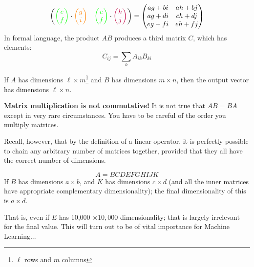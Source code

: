 \documentclass[a4paper,openany,11pt]{book}
\begin{document}
\begin{equation}
\begin{pmatrix}
							{\color{green} \begin{pmatrix} e \\ f \end{pmatrix}} \cdot {\color{orange}\begin{pmatrix} g \\ i \end{pmatrix}} & {\color{green} \begin{pmatrix} e \\ f \end{pmatrix}}  \cdot {\color{purple}\begin{pmatrix} h \\ j \end{pmatrix}} 
						\end{pmatrix}= \begin{pmatrix} ag + bi & ah + bj \\ ag + di & ch + dj \\ eg + fi & eh + fj \end{pmatrix}
					\end{equation}
					In formal language, the product $AB$ produces a third matrix $C$, which has elements:
					\begin{equation}
						C_{ij} = \sum_k A_{ik} B_{ki}
					\end{equation}

					If $A$ has dimensions $\ell \times m$\footnote{$\ell$ rows and $m$ columns} and $B$ has dimensions $m \times n$, then the output vector has dimensions $\ell \times n$.

					\textbf{Matrix multiplication is not commutative!} It is not true that $AB = BA$ except in very rare circumstances. You have to be careful of the order you multiply matrices.

					Recall, however, that by the definition of a linear operator, it is perfectly possible to chain any arbitrary number of matrices together, provided that they all have the correct number of dimensions.

					\begin{equation}
						A = BCDEFGHIJK
					\end{equation}
					If $B$ has dimensions $a \times b$, and $K$ has dimensions $c \times d$ (and all the inner matrices have appropriate complementary dimensionality); the final dimensionality of this is $a \times d$.

					That is, even if $E$ has 10,000 $\times 10,000$ dimensionality; that is largely irrelevant for the final value. This will turn out to be of vital importance for Machine Learning...
\end{document}
